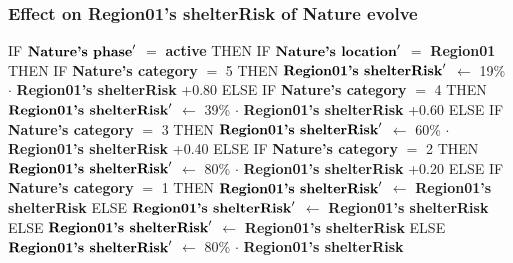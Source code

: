 \documentclass{article}%
\begin{document}
%
\subsubsection{Effect on Region01's shelterRisk of Nature evolve}%
\label{ssubsec:Effect on Region01's shelterRisk of Nature evolve}%
\begin{flushleft}%
IF %
$\mbox{\textbf{Nature's phase}} '$%
$=$%
\textbf{active}%
\linebreak%
\hspace*{2em}%
THEN %
IF %
$\mbox{\textbf{Nature's location}} '$%
$=$%
\textbf{Region01}%
\linebreak%
\hspace*{4em}%
THEN %
IF %
\textbf{Nature's category}%
$=$%
5%
\linebreak%
\hspace*{6em}%
THEN %
$\mbox{\textbf{Region01's shelterRisk}} '$%
$\leftarrow$%
19\%%
$\cdot$%
\textbf{Region01's shelterRisk}%
+0.80%
\linebreak%
\hspace*{6em}%
ELSE %
IF %
\textbf{Nature's category}%
$=$%
4%
\linebreak%
\hspace*{8em}%
THEN %
$\mbox{\textbf{Region01's shelterRisk}} '$%
$\leftarrow$%
39\%%
$\cdot$%
\textbf{Region01's shelterRisk}%
+0.60%
\linebreak%
\hspace*{8em}%
ELSE %
IF %
\textbf{Nature's category}%
$=$%
3%
\linebreak%
\hspace*{10em}%
THEN %
$\mbox{\textbf{Region01's shelterRisk}} '$%
$\leftarrow$%
60\%%
$\cdot$%
\textbf{Region01's shelterRisk}%
+0.40%
\linebreak%
\hspace*{10em}%
ELSE %
IF %
\textbf{Nature's category}%
$=$%
2%
\linebreak%
\hspace*{12em}%
THEN %
$\mbox{\textbf{Region01's shelterRisk}} '$%
$\leftarrow$%
80\%%
$\cdot$%
\textbf{Region01's shelterRisk}%
+0.20%
\linebreak%
\hspace*{12em}%
ELSE %
IF %
\textbf{Nature's category}%
$=$%
1%
\linebreak%
\hspace*{14em}%
THEN %
$\mbox{\textbf{Region01's shelterRisk}} '$%
$\leftarrow$%
\textbf{Region01's shelterRisk}%
\linebreak%
\hspace*{14em}%
ELSE %
$\mbox{\textbf{Region01's shelterRisk}} '$%
$\leftarrow$%
\textbf{Region01's shelterRisk}%
\linebreak%
\hspace*{4em}%
ELSE %
$\mbox{\textbf{Region01's shelterRisk}} '$%
$\leftarrow$%
\textbf{Region01's shelterRisk}%
\linebreak%
\hspace*{2em}%
ELSE %
$\mbox{\textbf{Region01's shelterRisk}} '$%
$\leftarrow$%
80\%%
$\cdot$%
\textbf{Region01's shelterRisk}%
\end{flushleft}
\end{document}
